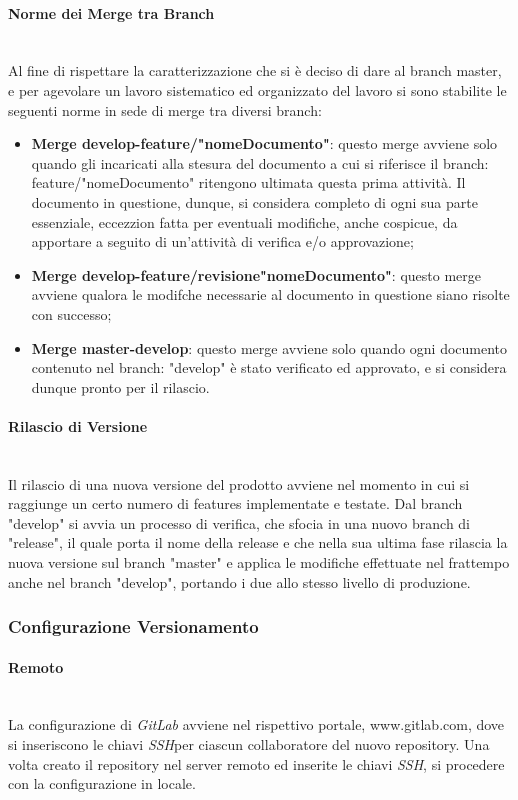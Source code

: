 \paragraph{Norme dei Merge tra Branch} ~\\
Al fine di rispettare la caratterizzazione che si è deciso di dare al branch master, e per agevolare un lavoro sistematico ed organizzato del lavoro si sono stabilite le seguenti norme in sede di merge tra diversi branch:
\begin{itemize}
	\item \textbf{Merge develop-feature/"nomeDocumento"}: questo merge avviene solo quando gli incaricati alla stesura del documento a cui si riferisce il branch: feature/"nomeDocumento" ritengono ultimata questa prima attività. Il documento in questione, dunque, si considera completo di ogni sua parte essenziale, eccezzion fatta per eventuali modifiche, anche cospicue, da apportare a seguito di un'attività di verifica e/o approvazione;
	\item \textbf{Merge develop-feature/revisione"nomeDocumento"}: questo merge avviene qualora le modifche necessarie al documento in questione siano risolte con successo;
	\item \textbf{Merge master-develop}: questo merge avviene solo quando ogni documento contenuto nel branch: "develop" è stato verificato ed approvato, e si considera dunque pronto per il rilascio.
\end{itemize}


\paragraph{Rilascio di Versione} \-\\
Il rilascio di una nuova versione del prodotto avviene nel momento in cui si raggiunge un certo numero di features implementate e testate.
Dal branch "develop" si avvia un processo di verifica, che sfocia in una nuovo branch di "release", il quale porta il nome della release e che nella sua ultima fase rilascia la nuova versione sul branch "master" e applica le modifiche effettuate nel frattempo anche nel branch "develop", portando i due allo stesso livello di produzione.

\subsubsection{Configurazione Versionamento}

\paragraph{Remoto} \-\\
	La configurazione di \textit{GitLab} avviene nel rispettivo portale, www.gitlab.com, dove si inseriscono le chiavi \textit{SSH}\glossario per ciascun collaboratore del nuovo repository.
	Una volta creato il repository nel server remoto ed inserite le chiavi \textit{SSH}, si procedere con la configurazione in locale.

